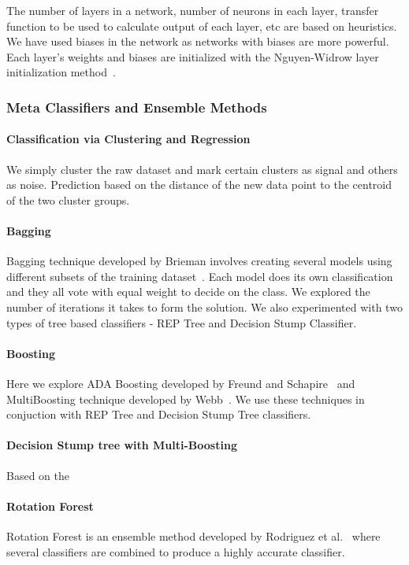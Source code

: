 The number of layers in a network, number of neurons in each layer, transfer function to be used to calculate output of each layer, etc are based on heuristics. We have used biases in the network as networks with biases are more powerful. Each layer's weights and biases are initialized with the Nguyen-Widrow layer initialization method~\cite{NN-Speed}.




\subsubsection{Meta Classifiers and Ensemble Methods}

\paragraph{Classification via Clustering and Regression}

We simply cluster the raw dataset and mark certain clusters as signal and others as noise. Prediction based on the distance of the new data point to the centroid of the two cluster groups. 

\paragraph{Bagging}

Bagging technique developed by Brieman involves creating several models using different subsets of the training dataset~\cite{Bagging}. Each model does its own classification and they all vote with equal weight to decide on the class. We explored the number of iterations it takes to form the solution. We also experimented with two types of tree based classifiers - REP Tree and Decision Stump Classifier.


\paragraph{Boosting}

Here we explore ADA Boosting developed by Freund and Schapire~\cite{ADABoosting} and MultiBoosting technique developed by Webb~\cite{MultiBoosting}. We use these techniques in conjuction with REP Tree and Decision Stump Tree classifiers.

\paragraph{Decision Stump tree with Multi-Boosting}

Based on the




\paragraph{Rotation Forest}

Rotation Forest is an ensemble method developed by Rodriguez et al.~\cite{RotationForest} where several classifiers are combined to produce a highly accurate classifier. 


